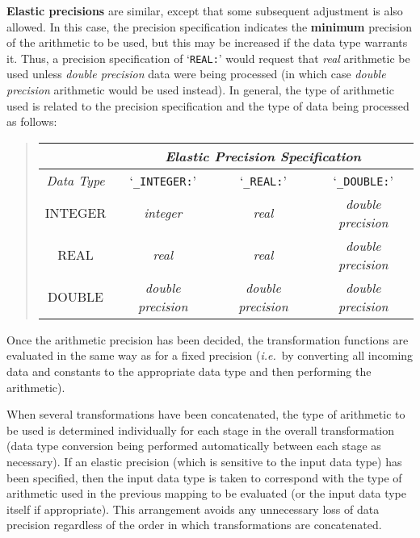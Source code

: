 \documentclass[twoside,11pt]{article}
\renewcommand{\_}{\texttt{\symbol{95}}}
\newcommand{\name}[1]{\mbox{\small{#1}}}
\begin{document}
\textbf{Elastic precisions} are similar, except that some subsequent
adjustment is also allowed.
In this case, the precision specification indicates the \textbf{minimum}
precision of the arithmetic to be used, but this may be increased if the
data type warrants it.
Thus, a precision specification of \mbox{`{\tt \_REAL:}'} would request that
\emph{real} arithmetic be used unless \emph{double precision} data were being
processed (in which case \emph{double precision} arithmetic would be used
instead).
In general, the type of arithmetic used is related to the precision
specification and the type of data being processed as follows:

\begin{quote}
\begin{center}
\begin{tabular}{|c|c|c|c|}
\cline{2-4}
\multicolumn{1}{c}{} & \multicolumn{3}{|c|}{\em Elastic Precision
Specification}\\
\hline
{\em Data Type} & `\verb#_INTEGER:#' & `\verb#_REAL:#' & `\verb#_DOUBLE:#' \\
\hline
\name{\_INTEGER} & {\em integer} & {\em real} & {\em double precision} \\
\name{\_REAL} & {\em real} & {\em real} & {\em double precision} \\
\name{\_DOUBLE} & {\em double precision} & {\em double precision} & {\em
double precision}\\
\hline
\end{tabular}
\end{center}
\end{quote}

Once the arithmetic precision has been decided, the transformation functions
are evaluated in the same way as for a fixed precision (\emph{i.e.}\ by
converting all incoming data and constants to the appropriate data type and
then performing the arithmetic).

When several transformations have been concatenated, the type of arithmetic
to be used is determined individually for each stage in the overall
transformation (data type conversion being performed automatically between
each stage as necessary).
If an elastic precision (which is sensitive to the input data type) has been
specified, then the input data type is taken to correspond with the type of
arithmetic used in the previous mapping to be evaluated (or the input data
type itself if appropriate).
This arrangement avoids any unnecessary loss of data precision regardless of
the order in which transformations are concatenated.
\end{document}
